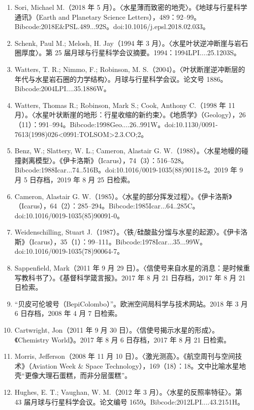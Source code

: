 \begin{enumerate}
    \item Sori, Michael M.（2018 年 5 月）。〈水星薄而致密的地壳〉。《地球与行星科学通讯》（Earth and Planetary Science Letters），489：92–99。Bibcode:2018E&PSL.489...92S。doi:10.1016/j.epsl.2018.02.033。
    \item Schenk, Paul M.; Melosh, H. Jay（1994 年 3 月）。〈水星叶状逆冲断崖与岩石圈厚度〉。第 25 届月球与行星科学会议摘要。1994：1994LPI....25.1203S。
    \item Watters, T. R.; Nimmo, F.; Robinson, M. S.（2004）。〈叶状断崖逆冲断层的年代与水星岩石圈的力学结构〉。月球与行星科学会议。论文号 1886。Bibcode:2004LPI....35.1886W。
    \item Watters, Thomas R.; Robinson, Mark S.; Cook, Anthony C.（1998 年 11 月）。〈水星叶状断崖的地形：行星收缩的新约束〉。《地质学》（Geology），26（11）：991–994。Bibcode:1998Geo....26..991W。doi:10.1130/0091-7613(1998)026<0991:TOLSOM>2.3.CO;2。
    \item Benz, W.; Slattery, W. L.; Cameron, Alastair G. W.（1988）。〈水星地幔的碰撞剥离模型〉。《伊卡洛斯》（Icarus），74（3）：516–528。Bibcode:1988Icar...74..516B。doi:10.1016/0019-1035(88)90118-2。2019 年 9 月 5 日存档，2019 年 8 月 25 日检索。
    \item Cameron, Alastair G. W.（1985）。〈水星的部分挥发过程〉。《伊卡洛斯》（Icarus），64（2）：285–294。Bibcode:1985Icar...64..285C。doi:10.1016/0019-1035(85)90091-0。
    \item Weidenschilling, Stuart J.（1987）。〈铁/硅酸盐分馏与水星的起源〉。《伊卡洛斯》（Icarus），35（1）：99–111。Bibcode:1978Icar...35...99W。doi:10.1016/0019-1035(78)90064-7。
    \item Sappenfield, Mark（2011 年 9 月 29 日）。〈信使号来自水星的消息：是时候重写教科书了〉。《基督科学箴言报》。2017 年 8 月 21 日存档，2017 年 8 月 21 日检索。
    \item “贝皮可伦坡号（BepiColombo）”。欧洲空间局科学与技术网站。2018 年 3 月 6 日存档，2008 年 4 月 7 日检索。
    \item Cartwright, Jon（2011 年 9 月 30 日）。〈信使号揭示水星的形成〉。《Chemistry World》。2017 年 8 月 6 日存档，2017 年 8 月 21 日检索。
    \item Morris, Jefferson（2008 年 11 月 10 日）。〈激光测高〉。《航空周刊与空间技术》（Aviation Week & Space Technology），169（18）：18。文中比喻水星地壳“更像大理石蛋糕，而非分层蛋糕”。
    \item Hughes, E. T.; Vaughan, W. M.（2012 年 3 月）。〈水星的反照率特征〉。第 43 届月球与行星科学会议。论文编号 1659。Bibcode:2012LPI....43.2151H。

\end{enumerate}
